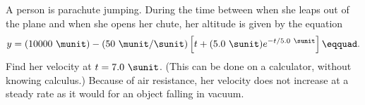   A person is parachute jumping.  During the time between
when she leaps out of the plane and when she opens her
chute, her altitude is given by the equation
\begin{equation*}
        y = (10000\ \munit) - (50\ \munit/\sunit)\left[t+(5.0\ \sunit)e^{-t/5.0\ \sunit}\right]\eqquad.
\end{equation*}
Find her velocity at $t=7.0\ \sunit$.  (This can be done on a
calculator, without knowing calculus.) Because of air
resistance, her velocity does not increase at a steady rate
as it would for an object falling in vacuum. \answercheck
